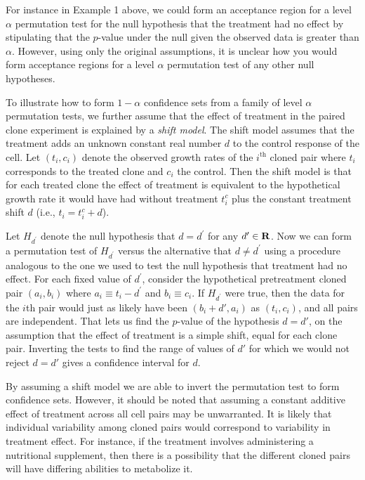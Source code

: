 For instance in Example 1 above, we could form an acceptance region for a level
$\alpha$ permutation test for the null hypothesis that the treatment had no
effect by stipulating that the $p$-value under the null given the observed data
is greater than $\alpha$.  However, using only the original assumptions, it is
unclear how you would form acceptance regions for a level $\alpha$ permutation
test of any other null hypotheses. 

\begin{example}[continues=exa:cont] To illustrate how to form $1-\alpha$
confidence sets from a family of level $\alpha$ permutation tests, we further
assume that the effect of treatment in the paired clone experiment is explained
by a \emph{shift model}.  The shift model assumes that the treatment
adds an unknown constant real number $d$ to the control response of the cell.
Let $(t_i, c_i)$ denote the observed growth rates of the $i^\text{th}$ cloned
pair where $t_i$ corresponds to the treated clone and $c_i$ the control.  Then
the shift model is that for each treated clone the effect of treatment is
equivalent to the hypothetical growth rate it would have had without treatment
$t_i^c$ plus the constant treatment shift $d$ (i.e., $t_i = t_i^c + d$).

Let $H_{d^\prime}$ denote the null hypothesis that $d=d^\prime$ for any
$d^\prime \in \mathbf{R}$.  Now we can form a permutation test of $H_{d^\prime}$
versus the alternative that $d \neq d^\prime$ using a procedure analogous to the
one we used to test the null hypothesis that treatment had no
effect. For each fixed value of $d^\prime$, consider the hypothetical
pretreatment cloned pair $(a_i, b_i)$ where $a_i\equiv t_i-d^\prime$ and $b_i
\equiv c_i$. If $H_{d^\prime}$ were true, then the data for the $i$th pair would
just as likely have been $(b_i+d', a_i)$ as $(t_i, c_i)$, and all pairs are
independent.
That lets us find the $p$-value of the hypothesis $d=d'$, on the assumption that
the effect of treatment is a simple shift, equal for each clone pair.
Inverting the tests to find the range of values of $d'$ for which we would not
reject $d=d'$ gives a confidence interval for $d$.

By assuming a shift model we are able to invert the permutation test to form
confidence sets.  However, it should be noted that assuming a constant additive
effect of treatment across all cell pairs may be unwarranted. It is likely
that individual variability among cloned pairs would correspond to variability
in treatment effect.  For instance, if the treatment involves administering a
nutritional supplement, then there is a possibility that the different cloned
pairs will have differing abilities to metabolize it.


\end{example}

